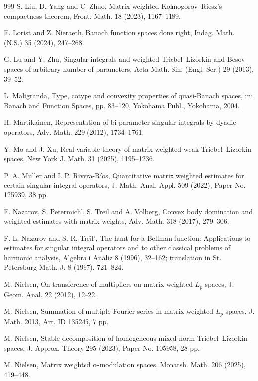 \documentclass[11pt, reqno]{amsart}
\theoremstyle{definition}
\theoremstyle{remark}
\numberwithin{equation}{section}
\begin{document}
\begin{thebibliography}{999}
S. Liu, D. Yang and C. Zhuo,
Matrix weighted Kolmogorov--Riesz's compactness theorem,
Front. Math. 18 (2023), 1167--1189.

E. Lorist and Z. Nieraeth,
Banach function spaces done right,
Indag. Math. (N.S.) 35 (2024), 247--268.

G. Lu and Y. Zhu,
Singular integrals and weighted Triebel--Lizorkin
and Besov spaces of arbitrary number of parameters,
Acta Math. Sin. (Engl. Ser.) 29 (2013), 39--52.

L. Maligranda,
Type, cotype and convexity properties of quasi-Banach spaces,
in: Banach and Function Spaces, pp. 83--120,
Yokohama Publ., Yokohama, 2004.

H. Martikainen,
Representation of bi-parameter singular integrals by dyadic operators,
Adv. Math. 229 (2012), 1734--1761.

Y. Mo and J. Xu,
Real-variable theory of matrix-weighted weak Triebel--Lizorkin spaces,
New York J. Math. 31 (2025), 1195--1236.

P. A. Muller and I. P. Rivera-R\'ios,
Quantitative matrix weighted estimates for certain singular integral operators,
J. Math. Anal. Appl. 509 (2022), Paper No. 125939, 38 pp.

F. Nazarov, S. Petermichl, S. Treil and A. Volberg,
Convex body domination and weighted estimates with matrix weights,
Adv. Math. 318 (2017), 279--306.

F. L. Nazarov and S. R. Tre\u{\i}l',
The hunt for a Bellman function: Applications to estimates for
singular integral operators and to other
classical problems of harmonic analysis,
Algebra i Analiz 8 (1996), 32--162;
translation in St. Petersburg Math. J. 8 (1997), 721--824.

M. Nielsen,
On transference of multipliers on matrix weighted $L_p$-spaces,
J. Geom. Anal. 22 (2012), 12--22.

M. Nielsen,
Summation of multiple Fourier series in matrix weighted $L_p$-spaces,
J. Math. 2013, Art. ID 135245, 7 pp.

M. Nielsen,
Stable decomposition of homogeneous mixed-norm Triebel--Lizorkin spaces,
J. Approx. Theory 295 (2023), Paper No. 105958, 28 pp.

M. Nielsen,
Matrix weighted $\alpha$-modulation spaces,
Monatsh. Math. 206 (2025), 419--448.


\end{thebibliography}
\end{document}
